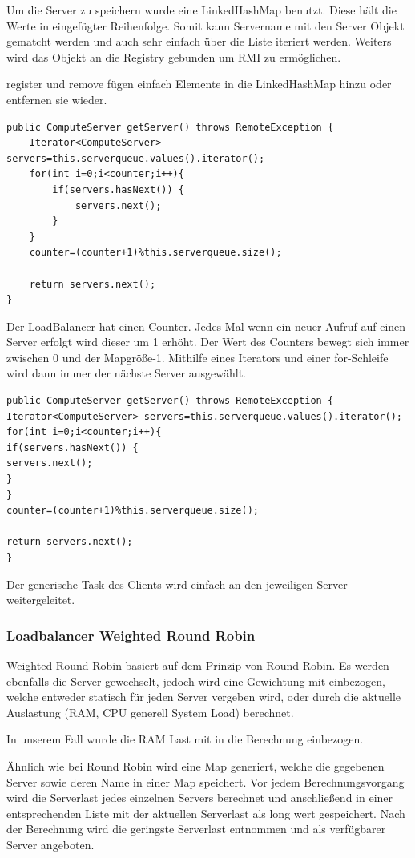 Um die Server zu speichern wurde eine LinkedHashMap benutzt. Diese hält die Werte in eingefügter Reihenfolge. Somit kann Servername mit den Server Objekt gematcht werden und auch sehr einfach über die Liste iteriert werden. 
Weiters wird das Objekt an die Registry gebunden um RMI zu ermöglichen. 

register und remove fügen einfach Elemente in die LinkedHashMap hinzu oder entfernen sie wieder. 

\begin{lstlisting}[style=Java, caption=RoundRobin getServer]	
  public ComputeServer getServer() throws RemoteException {
	Iterator<ComputeServer> servers=this.serverqueue.values().iterator();
	for(int i=0;i<counter;i++){
		if(servers.hasNext()) {
			servers.next();
		}
	}
	counter=(counter+1)%this.serverqueue.size();
	
	return servers.next();
}
\end{lstlisting}

Der LoadBalancer hat einen Counter. Jedes Mal wenn ein neuer Aufruf auf einen Server erfolgt wird dieser um 1 erhöht. 
Der Wert des Counters bewegt sich immer zwischen 0 und der Mapgröße-1.
Mithilfe eines Iterators und einer for-Schleife wird dann immer der nächste Server ausgewählt. 

\begin{lstlisting}[style=Java, caption=RoundRobin getServer]	
public ComputeServer getServer() throws RemoteException {
Iterator<ComputeServer> servers=this.serverqueue.values().iterator();
for(int i=0;i<counter;i++){
if(servers.hasNext()) {
servers.next();
}
}
counter=(counter+1)%this.serverqueue.size();

return servers.next();
}
\end{lstlisting}
Der generische Task des Clients wird einfach an den jeweiligen Server weitergeleitet. 


\subsubsection{Loadbalancer Weighted Round Robin}
Weighted Round Robin basiert auf dem Prinzip von Round Robin.
Es werden ebenfalls die Server gewechselt, jedoch wird eine Gewichtung mit einbezogen, welche entweder statisch für jeden Server vergeben wird, oder durch die aktuelle Auslastung (RAM, CPU generell System Load) berechnet.

In unserem Fall wurde die RAM Last mit in die Berechnung einbezogen.

Ähnlich wie bei Round Robin wird eine Map generiert, welche die gegebenen Server sowie deren Name in einer Map speichert.
Vor jedem Berechnungsvorgang wird die Serverlast jedes einzelnen Servers berechnet und anschließend in einer entsprechenden Liste mit der aktuellen Serverlast als long wert gespeichert.
Nach der Berechnung wird die geringste Serverlast entnommen und als verfügbarer Server angeboten.

